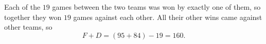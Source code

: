 Each of the $19$ games between the two teams was won by exactly one of them, so together they won $19$ games against each other. All their other wins came against other teams, so
\[
F+D=(95+84)-19=\boxed{160}.
\]

